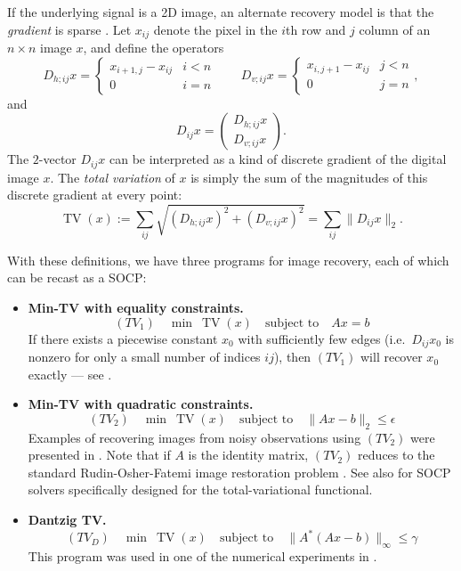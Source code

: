 \documentclass{article}
\newcommand{\<}{\langle}
\renewcommand{\>}{\rangle}
\begin{document}
If the underlying signal is a 2D image, an alternate recovery model is that the 
{\em gradient} is sparse \cite{rudin92no}.
Let $x_{ij}$ denote the pixel in the $i$th row and $j$ column of an $n\times n$ image $x$, and
define the operators 
\[
D_{h;ij}x = \begin{cases} x_{i+1,j}-x_{ij} & i < n\\
0 & i = n  \end{cases}
\qquad
D_{v;ij}x = \begin{cases} x_{i,j+1}-x_{ij} & j < n\\
0 & j = n  \end{cases},
\]
and
\begin{equation}
\label{eq:Dij}
D_{ij}x = \left(\begin{array}{c} D_{h;ij}x \\ D_{v;ij}x \end{array}\right).
\end{equation}
The $2$-vector $D_{ij}x$ can be interpreted as a kind of discrete gradient of the digital image $x$.
The {\em total variation} of $x$ is simply the sum of the magnitudes of this discrete gradient at every point:
\[
\operatorname{TV}(x) := \sum_{ij} \sqrt{(D_{h;ij}x)^2 + (D_{v;ij}x)^2} = 
\sum_{ij} \|D_{ij}x\|_2.
\]

With these definitions, we have three programs for image recovery, 
each of which can be recast as a SOCP:
\begin{itemize}
%
\item {\bf Min-TV with equality constraints.}
\[
(TV_1) \quad \min~\operatorname{TV}(x) \quad\text{subject~to}\quad Ax=b
\]
If there exists a piecewise constant $x_0$ with sufficiently few edges (i.e.\ $D_{ij}x_0$ is nonzero for only a small number of indices $ij$), then $(TV_1)$ will recover $x_0$ exactly --- see \cite{candes04ro}.
%
\item {\bf Min-TV with quadratic constraints.}
\[
(TV_2) \quad \min~\operatorname{TV}(x) \quad\text{subject~to}\quad \|Ax-b\|_2\leq\epsilon
\]
Examples of recovering images from noisy observations using $(TV_2)$ were presented in \cite{candes05st}.  Note that if $A$ is the identity matrix, $(TV_2)$ reduces to the standard Rudin-Osher-Fatemi image restoration problem \cite{rudin92no}.  See also 
\cite{chan99no,goldfarb04se,hintermueller05in,lobo98ap} for SOCP solvers specifically designed for the total-variational functional.

%
\item {\bf Dantzig TV.}
\[
(TV_D) \quad \min~\operatorname{TV}(x) \quad\text{subject~to}\quad \|A^*(Ax-b)\|_\infty\leq\gamma
\]
This program was used in one of the numerical experiments in \cite{candes05da}.
%
\end{itemize}
\end{document}
